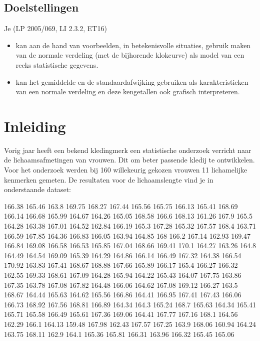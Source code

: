 \documentclass[12pt,twoside]{article}
\begin{document}
\subsection*{Doelstellingen}
{\singlespacing
Je \hfill  {\scriptsize(LP 2005/069, LI 2.3.2, ET16)}
\begin{itemize}
  \item kan aan de hand van voorbeelden, in betekenisvolle situaties, gebruik maken van de normale verdeling (met de bijhorende klokcurve) als model van een reeks statistische gegevens.
  \item kan het gemiddelde en de standaardafwijking gebruiken als karakteristieken van een normale verdeling en deze kengetallen ook grafisch interpreteren.
\end{itemize}

\thispagestyle{empty}
\mbox{}
\newpage
\clearpage
\thispagestyle{empty}
\tableofcontents
\newpage
\clearpage
{} 

\fancyhead[RE,LO]{}

\onehalfspacing

\section{Inleiding}

Vorig jaar heeft een bekend kledingmerk een statistische onderzoek verricht naar de lichaamsafmetingen van vrouwen. Dit om beter passende kledij te ontwikkelen. Voor het onderzoek werden bij 160 willekeurig gekozen vrouwen 11 lichamelijke kenmerken gemeten. De resultaten voor de lichaamslengte vind je in onderstaande dataset:

\begin{center}  
\singlespacing
\scriptsize
166.38
165.46
163.8
169.75
168.27
167.44
165.56
165.75
166.13
165.41
168.69
166.14
166.68
165.99
164.67
164.26
165.05
168.58
166.6
168.13
161.26
167.9
165.5
164.28
163.38
167.01
164.52
162.84
166.19
165.3
167.28
165.32
167.57
168.4
163.71
166.59
167.85
164.36
166.83
166.05
163.94
164.85
168
166.2
167.14
162.93
169.47
166.84
169.08
166.58
166.53
165.85
167.04
168.66
169.41
170.1
164.27
163.26
164.8
164.49
164.54
169.09
165.39
164.29
164.86
166.14
166.49
167.32
164.38
166.54
170.92
163.83
167.41
168.67
168.88
167.66
165.89
166.17
165.4
166.27
166.32
162.55
169.33
168.61
167.09
164.28
165.94
164.22
165.43
164.07
167.75
163.86
167.35
163.78
167.08
167.82
164.48
166.06
164.62
167.08
169.12
166.27
163.5
168.67
164.44
165.63
164.62
165.56
166.86
164.41
166.95
167.41
167.43
166.06
166.73
168.92
167.56
168.81
166.89
164.34
164.3
165.24
168.7
165.63
164.34
165.41
165.71
165.58
166.49
165.61
167.36
169.06
164.41
167.77
167.16
168.1
164.56
162.29
166.1
164.13
159.48
167.98
162.43
167.57
167.25
163.9
168.06
160.94
164.24
163.75
168.11
162.9
164.1
165.36
165.81
166.31
163.96
166.32
165.45
165.06
\end{center}

}
\end{document}

